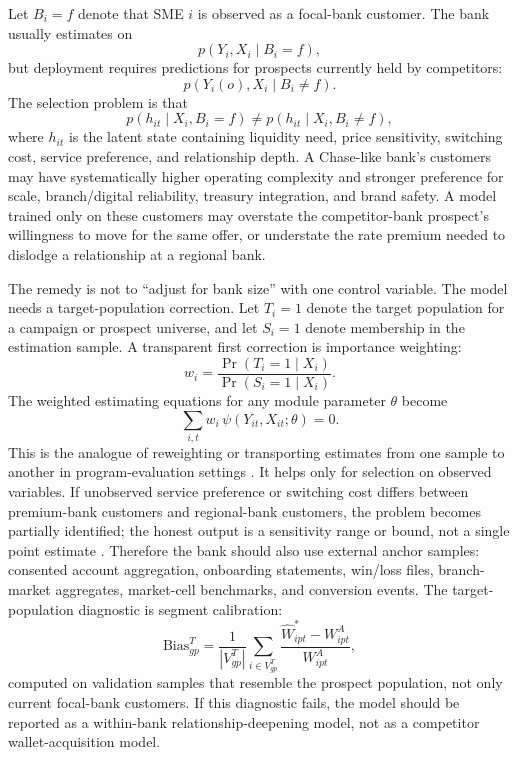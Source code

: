 \documentclass[11pt]{article}
\begin{document}
Let $B_i=f$ denote that SME $i$ is observed as a focal-bank customer. The bank
usually estimates on
\[
  p(Y_i,X_i\mid B_i=f),
\]
but deployment requires predictions for prospects currently held by competitors:
\[
  p(Y_i(o),X_i\mid B_i\neq f).
\]
The selection problem is that
\[
  p(h_{it}\mid X_i,B_i=f)
  \neq
  p(h_{it}\mid X_i,B_i\neq f),
\]
where $h_{it}$ is the latent state containing liquidity need, price sensitivity,
switching cost, service preference, and relationship depth. A Chase-like bank's
customers may have systematically higher operating complexity and stronger
preference for scale, branch/digital reliability, treasury integration, and
brand safety. A model trained only on these customers may overstate the
competitor-bank prospect's willingness to move for the same offer, or understate
the rate premium needed to dislodge a relationship at a regional bank.

The remedy is not to ``adjust for bank size'' with one control variable. The
model needs a target-population correction. Let $T_i=1$ denote the target
population for a campaign or prospect universe, and let $S_i=1$ denote
membership in the estimation sample. A transparent first correction is
importance weighting:
\[
  w_i
  =
  \frac{\Pr(T_i=1\mid X_i)}
       {\Pr(S_i=1\mid X_i)}.
\]
The weighted estimating equations for any module parameter $\theta$ become
\[
  \sum_{i,t} w_i\,\psi(Y_{it},X_{it};\theta)=0.
\]
This is the analogue of reweighting or transporting estimates from one sample
to another in program-evaluation settings \citep{hotz2005predicting}. It helps
only for selection on observed variables. If unobserved service preference or
switching cost differs between premium-bank customers and regional-bank
customers, the problem becomes partially identified; the honest output is a
sensitivity range or bound, not a single point estimate \citep{manski1990bounds}.
Therefore the bank should also use external anchor samples: consented account
aggregation, onboarding statements, win/loss files, branch-market aggregates,
market-cell benchmarks, and conversion events. The target-population diagnostic
is segment calibration:
\[
  \mathrm{Bias}_{gp}^{T}
  =
  \frac{1}{|V_{gp}^{T}|}
  \sum_{i\in V_{gp}^{T}}
  \frac{\widehat{W}_{ipt}^{*}-W_{ipt}^{A}}{W_{ipt}^{A}},
\]
computed on validation samples that resemble the prospect population, not only
current focal-bank customers. If this diagnostic fails, the model should be
reported as a within-bank relationship-deepening model, not as a competitor
wallet-acquisition model.
\end{document}
